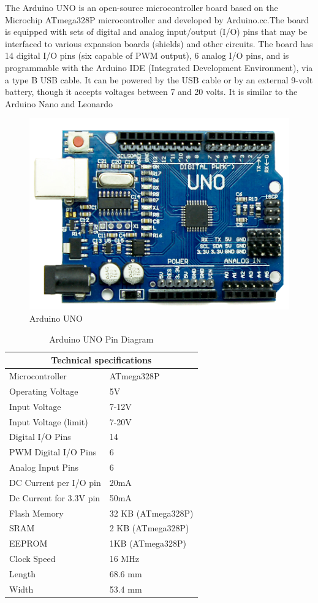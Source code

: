 The Arduino UNO is an open-source microcontroller board based on the Microchip ATmega328P microcontroller and developed by Arduino.cc.The board is equipped with sets of digital and analog input/output (I/O) pins that may be interfaced to various expansion boards (shields) and other circuits. The board has 14 digital I/O pins (six capable of PWM output), 6 analog I/O pins, and is programmable with the Arduino IDE (Integrated Development Environment), via a type B USB cable. It can be powered by the USB cable or by an external 9-volt battery, though it accepts voltages between 7 and 20 volts. It is similar to the Arduino Nano and Leonardo

\begin{figure}[!ht]
\centering
\includegraphics[scale=0.7]{figures/arduino-uno.png}
\caption{\label{img35} Arduino UNO}
\end{figure}

\begin{table}[!ht]
\centering
\begin{tabular}{ |p{5cm}|p{5cm}| }
\hline
\multicolumn{2}{|c|}{Technical specifications} \\
\hline
Microcontroller & ATmega328P\\
Operating Voltage & 5V\\
Input Voltage & 7-12V\\
Input Voltage (limit) & 7-20V\\
Digital I/O Pins & 14\\
PWM Digital I/O Pins & 6\\
Analog Input Pins & 6\\
DC Current per I/O pin & 20mA\\
Dc Current for 3.3V pin & 50mA\\
Flash Memory & 32 KB (ATmega328P)\\
SRAM & 2 KB (ATmega328P)\\
EEPROM & 1KB (ATmega328P)\\
Clock Speed & 16 MHz\\
Length & 68.6 mm\\
Width & 53.4 mm\\
\hline
\end{tabular}
\caption{\label{arduinopin}Arduino UNO Pin Diagram}
\end{table}


